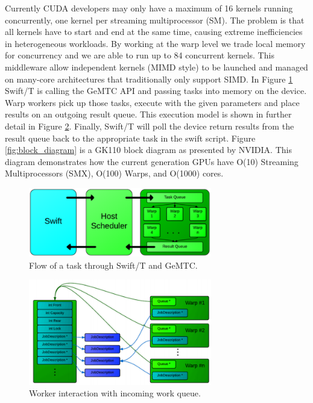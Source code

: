 \documentclass[conference]{IEEEtran}
\begin{document}
Currently CUDA developers may only have a maximum of 16 kernels running concurrently, one kernel per streaming multiprocessor (SM). The problem is that all kernels have to start and end at the same time, causing extreme inefficiencies in heterogeneous workloads. By working at the warp level we trade local memory for concurrency and we are able to run up to 84 concurrent kernels. \cite{kriederSC12} This middleware allow independent kernels (MIMD style) to be launched and managed on many-core architectures that traditionally only support SIMD. \cite{kriederXSEDE12} In Figure \ref{fig:big_pic} Swift/T is calling the GeMTC API and passing tasks into memory on the device. Warp workers pick up those tasks, execute with the given parameters and place results on an outgoing result queue. This execution model is shown in further detail in Figure \ref{fig:warps}. Finally, Swift/T will poll the device return results from the result queue back to the appropriate task in the swift script. Figure \ref{fig:block_diagram} is a  GK110 block diagram as presented by NVIDIA. \cite{GK110} This diagram demonstrates how the current generation GPUs have O(10) Streaming Multiprocessors (SMX), O(100) Warps, and O(1000) cores.
\begin{figure}[h]
\centering\includegraphics[width=8cm]{imgs/big_picture.png}
\caption{Flow of a task through Swift/T and GeMTC.}
\label{fig:big_pic}
\end{figure}

\begin{figure}[h]
\centering\includegraphics[width=8cm]{imgs/warps.png}
\caption{Worker interaction with incoming work queue.}
\label{fig:warps}
\end{figure}
\end{document}
